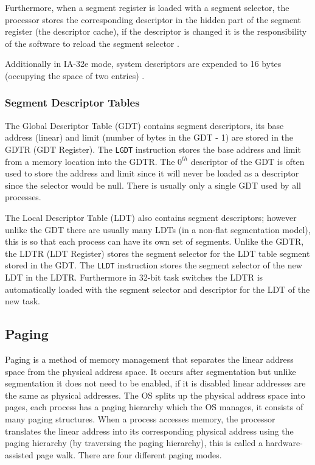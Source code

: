\documentclass{article}
\newcommand{\layout}[1]{\parbox{\linewidth}{#1}}
\begin{document}
Furthermore, when a segment register is loaded with a segment selector, the processor stores the corresponding descriptor in the hidden part of the segment register (the descriptor cache), if the descriptor is changed it is the responsibility of the software to reload the segment selector \cite[Chapter~3.4.3]{sdm3}.

\bigskip

Additionally in IA-32e mode, system descriptors are expended to 16 bytes (occupying the space of two entries) \cite[Chapter~3.52]{sdm3}.

\layout{
  \subsubsection{Segment Descriptor Tables}

  The Global Descriptor Table (GDT) contains segment descriptors, its base address (linear) and limit (number of bytes in the GDT - 1) are stored in the GDTR (GDT Register).
  The \texttt{LGDT} instruction stores the base address and limit from a memory location into the GDTR.
  The $0^{th}$ descriptor of the GDT is often used to store the address and limit since it will never be loaded as a descriptor since the selector would be null.
  There is usually only a single GDT used by all processes.
} \bigskip

\layout{
  The Local Descriptor Table (LDT) also contains segment descriptors; however unlike the GDT there are usually many LDTs (in a non-flat segmentation model), this is so that each process can have its own set of segments.
  Unlike the GDTR, the LDTR (LDT Register) stores the segment selector for the LDT table segment stored in the GDT.
  The \texttt{LLDT} instruction stores the segment selector of the new LDT in the LDTR.
  Furthermore in 32-bit task switches the LDTR is automatically loaded with the segment selector and descriptor for the LDT of the new task.

  \bigskip \cite[Chapter~3.5.1]{sdm3}
}

\layout{
  \subsection{Paging}


  Paging is a method of memory management that separates the linear address space from the physical address space.
  It occurs after segmentation but unlike segmentation it does not need to be enabled, if it is disabled linear addresses are the same as physical addresses.
  The OS splits up the physical address space into pages, each process has a paging hierarchy which the OS manages, it consists of many paging structures.
  When a process accesses memory, the processor translates the linear address into its corresponding physical address using the paging hierarchy (by traversing the paging hierarchy), this is called a hardware-assisted page walk.
  There are four different paging modes.
}
\end{document}
